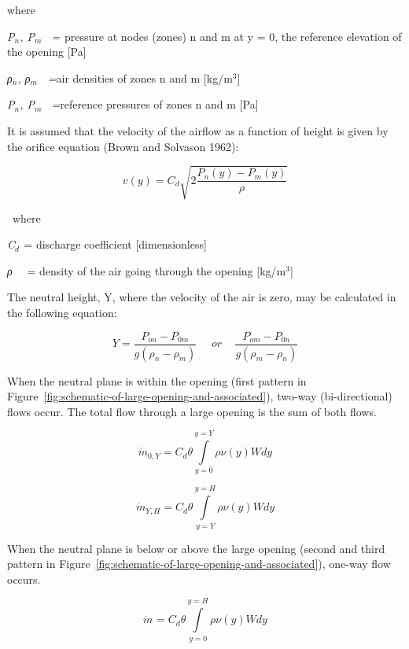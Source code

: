 where

\emph{P\(_{n}\), P\(_{m}\)~ = \(_{ }\)}pressure at nodes (zones) n and m at y = 0, the reference elevation of the opening {[}Pa{]}

\emph{ρ\(_{n}\), ρ\(_{m}\)\(_{ }\)~ =}air densities of zones n and m {[}kg/m\(^{3}\){]}

\emph{P\(_{n}\), P\(_{m}\)~ =}reference pressures of zones n and m {[}Pa{]}

It is assumed that the velocity of the airflow as a function of height is given by the orifice equation (Brown and Solvason 1962):

\begin{equation}
v(y) = {C_d}\sqrt {2\frac{{{P_n}(y) - {P_m}(y)}}{\rho }}
\end{equation}

~where

\emph{C\(_{d}\)}\(_{ }\) = discharge coefficient {[}dimensionless{]}

\emph{ρ}~~ = density of the air going through the opening {[}kg/m\(^{3}\){]}

The neutral height, Y, where the velocity of the air is zero, may be calculated in the following equation:

\begin{equation}
Y = \frac{{{P_{on}} - {P_{0m}}}}{{g({\rho_n} - {\rho_m})}}\,\,\,\,\,\,\,\,or\,\,\,\,\,\,\,\frac{{{P_{om}} - {P_{0n}}}}{{g({\rho_m} - {\rho_n})}}
\end{equation}

When the neutral plane is within the opening (first pattern in Figure~\ref{fig:schematic-of-large-opening-and-associated}), two-way (bi-directional) flows occur. The total flow through a large opening is the sum of both flows.

\begin{equation}
{\dot m_{0,Y}} = {C_d}\theta \int\limits_{y = 0}^{y = Y} {\rho \nu (y)Wdy}
\end{equation}

\begin{equation}
{\dot m_{Y,H}} = {C_d}\theta \int\limits_{y = Y}^{y = H} {\rho \nu (y)Wdy}
\end{equation}

When the neutral plane is below or above the large opening (second and third pattern in Figure~\ref{fig:schematic-of-large-opening-and-associated}), one-way flow occurs.

\begin{equation}
{\dot m_{}} = {C_d}\theta \int\limits_{y = 0}^{y = H} {\rho \nu (y)Wdy}
\end{equation}

